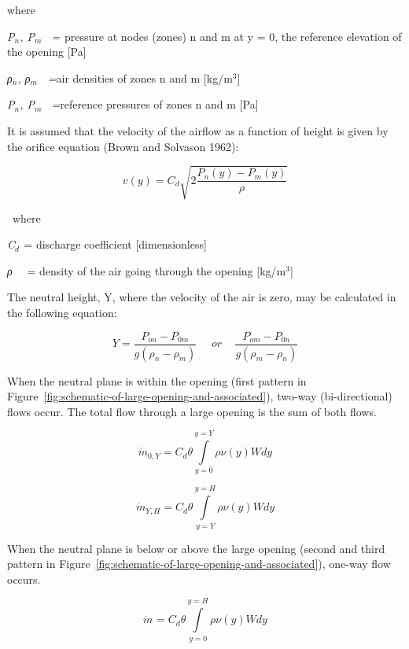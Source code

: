 where

\emph{P\(_{n}\), P\(_{m}\)~ = \(_{ }\)}pressure at nodes (zones) n and m at y = 0, the reference elevation of the opening {[}Pa{]}

\emph{ρ\(_{n}\), ρ\(_{m}\)\(_{ }\)~ =}air densities of zones n and m {[}kg/m\(^{3}\){]}

\emph{P\(_{n}\), P\(_{m}\)~ =}reference pressures of zones n and m {[}Pa{]}

It is assumed that the velocity of the airflow as a function of height is given by the orifice equation (Brown and Solvason 1962):

\begin{equation}
v(y) = {C_d}\sqrt {2\frac{{{P_n}(y) - {P_m}(y)}}{\rho }}
\end{equation}

~where

\emph{C\(_{d}\)}\(_{ }\) = discharge coefficient {[}dimensionless{]}

\emph{ρ}~~ = density of the air going through the opening {[}kg/m\(^{3}\){]}

The neutral height, Y, where the velocity of the air is zero, may be calculated in the following equation:

\begin{equation}
Y = \frac{{{P_{on}} - {P_{0m}}}}{{g({\rho_n} - {\rho_m})}}\,\,\,\,\,\,\,\,or\,\,\,\,\,\,\,\frac{{{P_{om}} - {P_{0n}}}}{{g({\rho_m} - {\rho_n})}}
\end{equation}

When the neutral plane is within the opening (first pattern in Figure~\ref{fig:schematic-of-large-opening-and-associated}), two-way (bi-directional) flows occur. The total flow through a large opening is the sum of both flows.

\begin{equation}
{\dot m_{0,Y}} = {C_d}\theta \int\limits_{y = 0}^{y = Y} {\rho \nu (y)Wdy}
\end{equation}

\begin{equation}
{\dot m_{Y,H}} = {C_d}\theta \int\limits_{y = Y}^{y = H} {\rho \nu (y)Wdy}
\end{equation}

When the neutral plane is below or above the large opening (second and third pattern in Figure~\ref{fig:schematic-of-large-opening-and-associated}), one-way flow occurs.

\begin{equation}
{\dot m_{}} = {C_d}\theta \int\limits_{y = 0}^{y = H} {\rho \nu (y)Wdy}
\end{equation}

